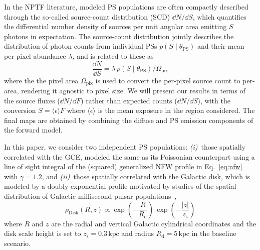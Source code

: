 \documentclass[prd,aps,10pt,nofootinbib,twocolumn,superscriptaddress,preprintnumbers,balancelastpage,longbibliography]{revtex4-1}
\begin{document}
In the NPTF literature, modeled PS populations are often compactly described through the so-called source-count distribution (SCD) $\dd N /\dd S$, which quantifies the differential number density of sources per unit angular area emitting $S$ photons in expectation. The source-count distribution jointly describes the distribution of photon counts from individual PSs $p(S\mid\theta_\mathrm{PS})$ and their mean per-pixel abundance $\lambda$, and is related to these as
\begin{equation}
\label{eq:scd_ps}
\frac{\dd N}{\dd S}=\lambda \, p(S\mid\theta_\mathrm{PS}) / \Omega_\mathrm{pix}
\end{equation}
where the the pixel area $\Omega_\mathrm{pix}$ is used to convert the per-pixel source count to per-area, rendering it agnostic to pixel size. We will present our results in terms of the source fluxes ($\dd N /\dd F$) rather than expected counts ($\dd N /\dd S$), with the conversion $S = \langle \epsilon \rangle F$ where $\langle \epsilon \rangle$ is the mean exposure in the region considered. The final maps are obtained by combining the diffuse and PS emission components of the forward model.

In this paper, we consider two independent PS populations: \emph{(i)}~those spatially correlated with the GCE, modeled the same as its Poissonian counterpart using a line of sight integral of the (squared) generalized NFW profile in Eq.~\eqref{eq:nfw} with $\gamma = 1.2$, and \emph{(ii)}~those spatially correlated with the Galactic disk, which is modeled by a doubly-exponential profile motivated by studies of the spatial distribution of Galactic millisecond pulsar populations~\cite{Lorimer:2006qs, Bartels:2018xom},
\begin{equation}
\label{eq:disk_spatial}
\rho_\mathrm{Disk}(R, z) \propto \exp \left(-\frac{R}{R_\mathrm{d}}\right) \, \exp\left(-\frac{|z|}{z_\mathrm{s}}\right)
\end{equation}
where $R$ and $z$ are the radial and vertical Galactic cylindrical coordinates and the disk scale height is set to $z_\mathrm{s} = 0.3\,\mathrm{kpc}$ and radius $R_\mathrm{d} = 5\,\mathrm{kpc}$ in the baseline scenario.  %
\end{document}
